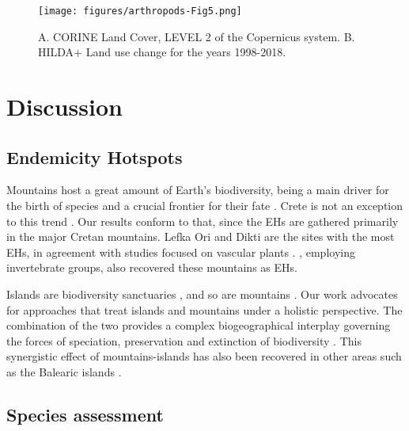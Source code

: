    \begin{figure}[ht]
      \centering
      \texttt{[image: figures/arthropods-Fig5.png]}
      \caption[Land Use of Crete and the changes]{A. CORINE Land Cover, LEVEL 2 of the Copernicus system. B. HILDA+ Land use change for the years 1998-2018.}
      \label{fig:arthropods-fig5}
   \end{figure}


\section{Discussion}
\label{sec:arthropods-discussion}

    \subsection{Endemicity Hotspots}
    \label{subsec:arthropods-Endemicity-Hotspots}

Mountains host a great amount of Earth’s biodiversity, being a main driver for
the birth of species \parencite{antonelli2018geological,noroozi2018hotspots,rahbek2019building,Rahbek2019}
and a crucial frontier for their fate \parencite{steinbauer2018accelerated,urban2018escalator}.
Crete is not an exception to this trend \parencite{kougioumoutzis2020plant,trigas2013elevational}.
Our results conform to that, since the EHs are gathered primarily in the major
Cretan mountains. Lefka Ori and Dikti are the sites with the most
EHs, in agreement with studies focused on vascular plants \parencite{dimitrakopoulos2004questioning,kougioumoutzis2020plant}.
\textcite{sfenthourakis2001hotspots}, employing invertebrate groups, also recovered these mountains as EHs.

Islands are biodiversity sanctuaries \parencite{whittaker2007island}, and
so are mountains \parencite{rahbek2019humboldts}. Our work advocates for approaches that
treat islands and mountains under a holistic perspective. The combination of
the two provides a complex biogeographical interplay governing the forces of
speciation, preservation and extinction of biodiversity \parencite{steinbauer2016topography-driven}.
This synergistic effect of mountains-islands has also been recovered in other
areas such as the Balearic islands \parencite{guardiola2023are-mediterranean}.

    \subsection{Species assessment}
    \label{subsec:arthropods-species-assessment-disc}

